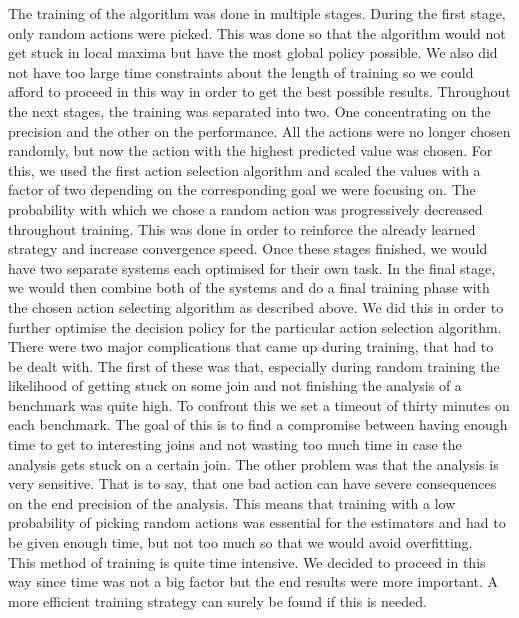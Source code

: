 The training of the algorithm was done in multiple stages. During the first stage, only random actions were picked. This was done so that the algorithm would not get stuck in local maxima but have the most global policy possible. We also did not have too large time constraints about the length of training so we could afford to proceed in this way in order to get the best possible results. Throughout the next stages, the training was separated into two. One concentrating on the precision and the other on the performance. All the actions were no longer chosen randomly, but now the action with the highest predicted value was chosen. For this, we used the first action selection algorithm and scaled the values with a factor of two depending on the corresponding goal we were focusing on. The probability with which we chose a random action was progressively decreased throughout training. This was done in order to reinforce the already learned strategy and increase convergence speed. Once these stages finished, we would have two separate systems each optimised for their own task. In the final stage, we would then combine both of the systems and do a final training phase with the chosen action selecting algorithm as described above. We did this in order to further optimise the decision policy for the particular action selection algorithm.\\
There were two major complications that came up during training, that had to be dealt with. The first of these was that, especially during random training the likelihood of getting stuck on some join and not finishing the analysis of a benchmark was quite high. To confront this we set a timeout of thirty minutes on each benchmark. The goal of this is to find a compromise between having enough time to get to interesting joins and not wasting too much time in case the analysis gets stuck on a certain join. The other problem was that the analysis is very sensitive. That is to say, that one bad action can have severe consequences on the end precision of the analysis. This means that training with a low probability of picking random actions was essential for the estimators and had to be given enough time, but not too much so that we would avoid overfitting.\\
This method of training is quite time intensive. We decided to proceed in this way since time was not a big factor but the end results were more important. A more efficient training strategy can surely be found if this is needed.



















